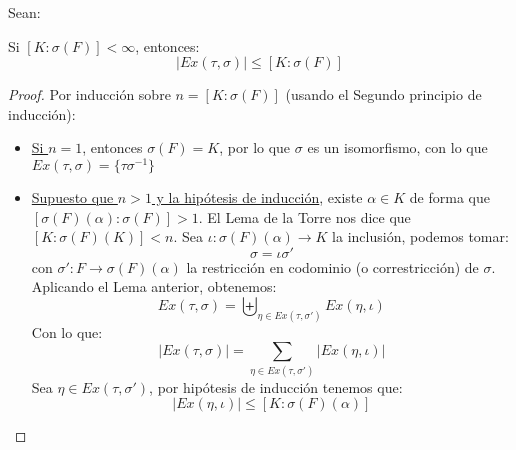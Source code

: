 \begin{prop}
    Sean:
    \begin{figure}[H]
        \centering
    \end{figure}
    Si $[K:\sigma(F)]<\infty$, entonces:
    \begin{equation*}
        |Ex(\tau,\sigma)| \leq [K:\sigma(F)]
    \end{equation*}
    \begin{proof}
        Por inducción sobre $n = [K:\sigma(F)]$ (usando el Segundo principio de inducción):
        \begin{itemize}
            \item \underline{Si $n=1$}, entonces $\sigma(F) = K$, por lo que $\sigma$ es un isomorfismo, con lo que $Ex(\tau,\sigma) = \{\tau \sigma^{-1}\}$
            \item \underline{Supuesto que $n>1$ y la hipótesis de inducción}, existe $\alpha \in K$ de forma que $[\sigma(F)(\alpha):\sigma(F)]>1$. El Lema de la Torre nos dice que $[K:\sigma(F)(K)]<n$. Sea $\iota:\sigma(F)(\alpha)\to K$ la inclusión, podemos tomar:
                \begin{equation*}
                    \sigma = \iota \sigma'
                \end{equation*}
                con $\sigma':F\to \sigma(F)(\alpha)$ la restricción en codominio (o correstricción) de $\sigma$. Aplicando el Lema anterior, obtenemos:
                \begin{equation*}
                    Ex(\tau,\sigma) = \biguplus_{\eta \in Ex(\tau,\sigma')}Ex(\eta, \iota)
                \end{equation*}
                Con lo que:
                \begin{equation*}
                    |Ex(\tau,\sigma)| = \sum_{\eta \in  Ex(\tau, \sigma')}|Ex(\eta,\iota)|
                \end{equation*}
                Sea $\eta\in Ex(\tau,\sigma')$, por hipótesis de inducción tenemos que:
                \begin{equation*}
                    |Ex(\eta,\iota)| \leq [K:\sigma(F)(\alpha)]
                \end{equation*}


\end{itemize}
\end{proof}
\end{prop}
